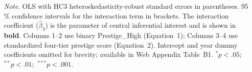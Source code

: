 \documentclass[12pt,a4paper]{article}
\begin{document}
\begin{table}[htbp]
\begin{threeparttable}
\begin{tabular}{lcccc}
\bottomrule
\end{tabular}
\begin{tablenotes}
\footnotesize
\item \textit{Note.} OLS with HC3 heteroskedasticity-robust standard errors
  in parentheses. 95\,\% confidence intervals for the interaction term in
  brackets. The interaction coefficient ($\hat{\beta}_3$) is the parameter of
  central inferential interest and is shown in \textbf{bold}.
  Columns 1--2 use binary Prestige\_High (Equation~1);
  Columns 3--4 use standardized four-tier prestige score (Equation~2).
  Intercept and year dummy coefficients omitted for brevity; available in
  Web Appendix Table~B1.
  $^{*}p<.05$;\ $^{**}p<.01$;\ $^{***}p<.001$.
\end{tablenotes}
\end{threeparttable}
\end{table}

\newpage
\end{document}

